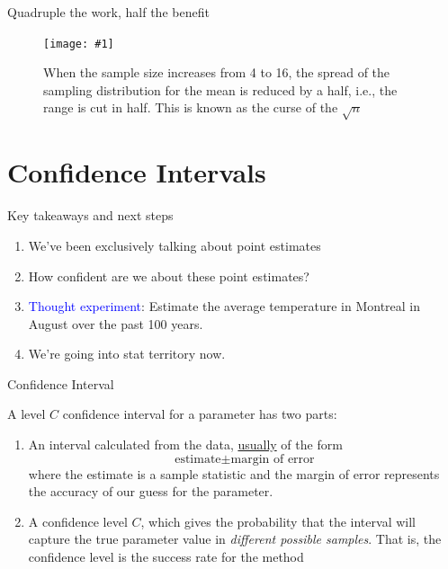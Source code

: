 \documentclass{beamer}\usepackage[]{graphicx}\usepackage[]{color}
\newcommand {\framedgraphiccaption}[2] {
	\begin{figure}
		\centering
		\texttt{[image: \#1]}
		\caption{#2}
	\end{figure}
}
\newcommand {\framedgraphic}[1] {
	\begin{figure}
		\centering
		\texttt{[image: \#1]}
	\end{figure}
}
\begin{document}
\begin{frame}[fragile]{Quadruple the work, half the benefit}

\framedgraphiccaption{ROOToceanAll.png}{When the sample size increases from 4 to 16, the spread of the sampling distribution for the mean is reduced by a half, i.e., the range is cut in half. This is known as the curse of the $\sqrt{n}$}
\end{frame}


\section{Confidence Intervals}


\begin{frame}{Key takeaways and next steps}
\begin{enumerate}
	\setlength\itemsep{2em}
	\item We've been exclusively talking about point estimates \pause
	\item How confident are we about these point estimates? \pause
	\item \textcolor{blue}{Thought experiment}: Estimate the average temperature in Montreal in August over the past 100 years. \pause  
	\item We're going into stat territory now. 
\end{enumerate}
\end{frame}


\begin{frame}{Confidence Interval}

\begin{defm}
A level $C$ confidence interval for a parameter has two parts:
\begin{enumerate}
	\item An interval calculated from the data, \underline{usually} of the form $$\textrm{estimate} \pm \textrm{margin of error}$$ where the estimate is a sample statistic and the margin of error represents the accuracy of our guess for the parameter.
 \item A confidence level $C$, which gives the probability that the interval will capture the true parameter value in \textit{different possible samples}. That is, the confidence level is the success rate for the method
\end{enumerate}
\end{defm}


\end{frame}
\end{document}

